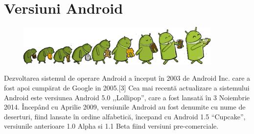 \section{Versiuni Android}
\vspace{1cm}
\begin{center}
\begin{figure}[htbp]
\includegraphics[width=0.9\textwidth]
{imagini/androidVersions.eps}
\end{figure}
\end{center}
Dezvoltarea sistemul de operare Android a început în 2003 de Android Inc. care a fost apoi cumpărat de Google in 2005.[3]
Cea mai recentă actualizare a sistemului Android este versiunea Android 5.0 ,,Lollipop'', care a fost lansată în 3 Noiembrie 2014. Începând cu Aprilie 2009, versiunile Android au fost denumite cu nume de deserturi, fiind lansate în ordine alfabetică, începand cu Android 1.5 ``Cupcake'', versiunile anterioare 1.0 Alpha si 1.1 Beta fiind versiuni pre-comerciale.\cite{9}\newline
